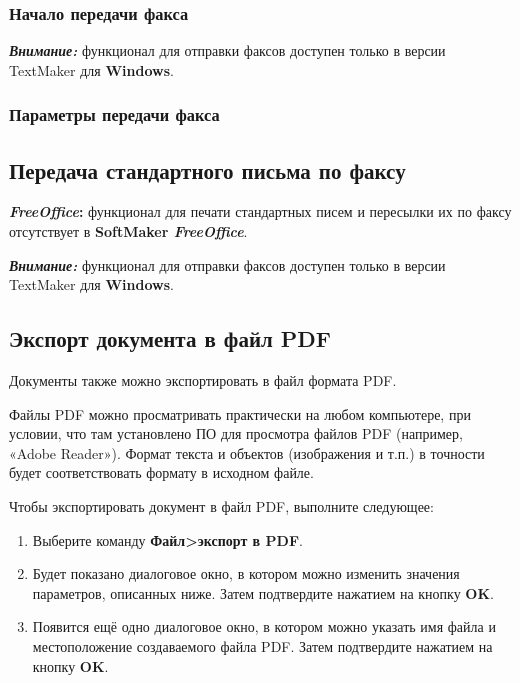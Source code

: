 ﻿\documentclass[a4paper,10pt]{article}
\begin{document}
\subsubsection{Начало передачи факса}
\begin{mdframed}[backgroundcolor=blue!10]
\textbf{\textit{Внимание:}} функционал для отправки факсов доступен только в версии TextMaker для \textbf{Windows}.
\end{mdframed}
\subsubsection{Параметры передачи факса}

\subsection{Передача стандартного письма по факсу}
 \begin{mdframed}[backgroundcolor=pink!50]
\textbf{\textit{FreeOffice}:} функционал для печати стандартных писем и пересылки их по факсу отсутствует в \textbf{SoftMaker \textit{FreeOffice}}.
\end{mdframed}
\begin{mdframed}[backgroundcolor=blue!10]
\textbf{\textit{Внимание:}} функционал для отправки факсов доступен только в версии TextMaker для \textbf{Windows}.
\end{mdframed}

\subsection{Экспорт документа в файл PDF}
Документы также можно экспортировать в файл формата PDF.

Файлы PDF можно просматривать практически на любом компьютере, при условии, что там установлено ПО для просмотра файлов PDF (например, «Adobe Reader»). Формат текста и объектов (изображения и т.п.) в точности будет соответствовать формату в исходном файле.

Чтобы экспортировать документ в файл PDF, выполните следующее:
\begin{enumerate}
 \item Выберите команду \textbf{Файл>экспорт в PDF}.
 \item Будет показано диалоговое окно, в котором можно изменить значения параметров, описанных ниже. Затем подтвердите нажатием на кнопку \textbf{OK}.
 \item Появится ещё одно диалоговое окно, в котором можно указать имя файла и местоположение создаваемого файла PDF. Затем подтвердите нажатием на кнопку \textbf{OK}.
\end{enumerate}
\end{document}
